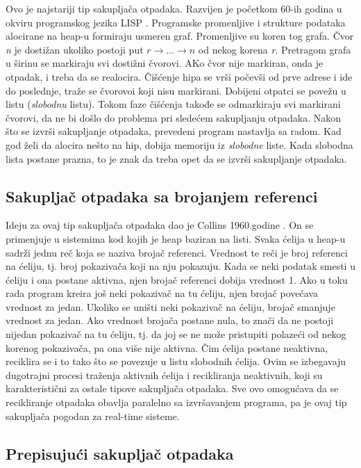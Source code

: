 Ovo je najstariji tip sakupljača otpadaka. Razvijen je početkom 60-ih godina u
okviru programskog jezika LISP \cite{mcca60}.
Programske promenljive i strukture podataka alocirane na heap-u formiraju usmeren graf.
Promenljive su koren tog grafa.
Čvor \textit{n} je dostižan ukoliko postoji put $r\rightarrow \dots \rightarrow n$ od nekog korena \textit{r}.
Pretragom grafa u širinu se markiraju svi dostižni čvorovi.
AKo čvor nije markiran, onda je otpadak, i treba da se realocira.
Čišćenje hipa se vrši počevši od prve adrese i ide do poslednje, traže se čvorovoi koji nisu markirani.
Dobijeni otpatci se povežu u listu (\textit{slobodnu} listu).
Tokom faze čišćenja takođe se odmarkiraju svi markirani čvorovi, da ne bi došlo do problema pri sledećem sakupljanju otpadaka.
Nakon što se izvrši sakupljanje otpadaka, prevedeni program nastavlja sa radom.
Kad god želi da alocira nešto na hip, dobija memoriju iz \textit{slobodne} liste. Kada slobodna lista postane prazna, to je znak da treba opet da se izvrši sakupljanje otpadaka.

\subsection{Sakupljač otpadaka sa brojanjem referenci}
\label{ref:reference counter}

Ideju za ovaj tip sakupljača otpadaka dao je Collins 1960.godine \cite{col60}.
On se primenjuje u sistemima kod kojih je heap baziran na listi.
Svaka ćelija u heap-u sadrži jednu reč koja se naziva brojač referenci.
Vrednost te reči je broj referenci na ćeliju, tj. broj pokazivača koji na nju pokazuju.
Kada se neki podatak smesti u ćeliju i ona postane aktivna, njen brojač referenci dobija vrednost 1.
Ako u toku rada program kreira još neki pokazivač na tu ćeliju, njen brojač povećava vrednost za jedan.
Ukoliko se uništi neki pokazivač na ćeliju, brojač smanjuje vrednost za jedan.
Ako vrednost brojača postane nula, to znači da ne postoji nijedan pokazivač na tu ćeliju, tj. da joj se ne može pristupiti polazeći od nekog korenog pokazivača, pa ona više nije aktivna.
Čim ćelija postane neaktivna, reciklira se i to tako što se povezuje u listu slobodnih ćelija.
Ovim se izbegavaju dugotrajni procesi traženja aktivnih ćelija i recikliranja neaktivnih, koji su karakteristični za ostale tipove sakupljača otpadaka.
Sve ovo omogućava da se recikliranje otpadaka obavlja paralelno sa izvršavanjem programa, pa je ovaj tip sakupljača pogodan za real-time sisteme.

\subsection{Prepisujući sakupljač otpadaka}

